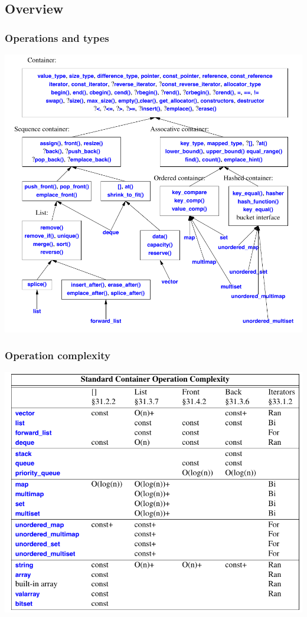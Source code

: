 \subsection{Overview}
\begin{frame}
  \frametitle{Operations and types}
  \centering
  \includegraphics[height=0.95\textheight]{img/members.png}
\end{frame}

\begin{frame}
  \frametitle{Operation complexity}
  \centering
  \includegraphics[height=0.9\textheight]{img/complexity.png}
\end{frame}

